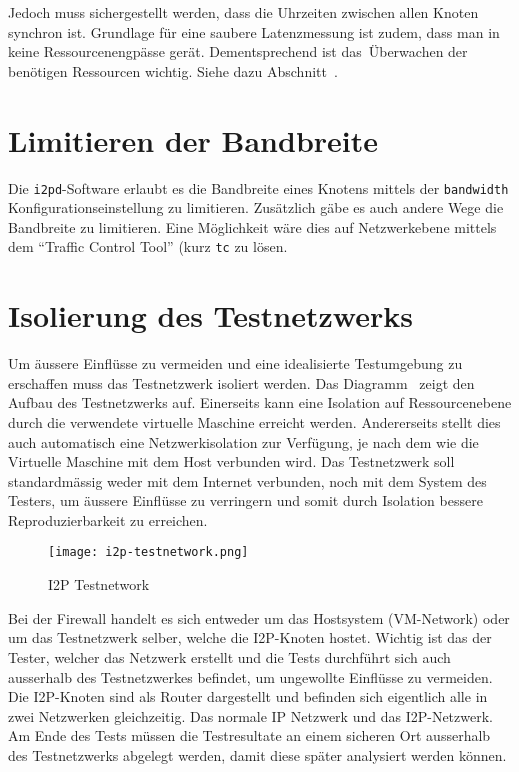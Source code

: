 
Jedoch muss sichergestellt werden, dass die Uhrzeiten zwischen allen Knoten synchron ist.
Grundlage für eine saubere Latenzmessung ist zudem, dass man in keine Ressourcenengpässe gerät.
Dementsprechend ist das Überwachen der benötigen Ressourcen wichtig. Siehe dazu Abschnitt~.

\section{Limitieren der Bandbreite}

Die \lstinline|i2pd|-Software erlaubt es die Bandbreite eines Knotens  mittels der \lstinline|bandwidth| Konfigurationseinstellung  zu limitieren. \parencite{noauthor_i2p_nodate-3}
Zusätzlich gäbe es auch andere Wege die Bandbreite zu limitieren.
Eine Möglichkeit wäre dies auf Netzwerkebene mittels dem ``Traffic Control Tool'' (kurz \lstinline|tc| zu lösen.

\section{Isolierung des Testnetzwerks}
\label{sec:isolierung}

Um äussere Einflüsse zu vermeiden und eine idealisierte Testumgebung zu erschaffen muss das Testnetzwerk isoliert werden.
Das Diagramm~ zeigt den Aufbau des Testnetzwerks auf.
Einerseits kann eine Isolation auf Ressourcenebene durch die verwendete virtuelle Maschine erreicht werden.
Andererseits stellt dies auch automatisch eine Netzwerkisolation zur Verfügung, je nach dem wie die Virtuelle Maschine mit dem Host verbunden wird.
Das Testnetzwerk soll standardmässig weder mit dem Internet verbunden, noch mit dem System des Testers, um äussere Einflüsse zu verringern und somit durch Isolation bessere Reproduzierbarkeit zu erreichen.

\begin{figure*}[ht]
  \texttt{[image: i2p-testnetwork.png]}
  \caption{I2P Testnetwork}\label{fig:i2p-testnetwork}
\end{figure*}

Bei der Firewall handelt es sich entweder um das Hostsystem (VM-Network) oder um das Testnetzwerk selber, welche die I2P-Knoten hostet.
Wichtig ist das der Tester, welcher das Netzwerk erstellt und die Tests durchführt sich auch ausserhalb des Testnetzwerkes befindet, um ungewollte Einflüsse zu vermeiden.
Die I2P-Knoten sind als Router dargestellt und befinden sich eigentlich alle in zwei Netzwerken gleichzeitig. Das normale IP Netzwerk und das I2P-Netzwerk.
Am Ende des Tests müssen die Testresultate an einem sicheren Ort ausserhalb des Testnetzwerks abgelegt werden, damit diese später analysiert werden können.

